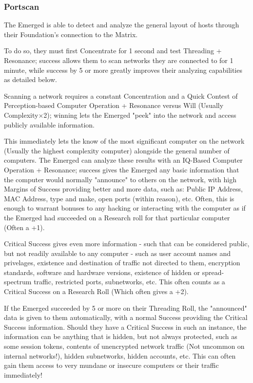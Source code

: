 \begin{multicols*}{3}
	\subsubsection*{Portscan}\label{portscan}
	
	The Emerged is able to detect and analyze the general layout of hosts through their Foundation's connection to the Matrix.
	
	To do so, they must first Concentrate for 1 second and test Threading + Resonance; success allows them to scan networks they are connected to for 1 minute, while success by 5 or more greatly improves their analyzing capabilities as detailed below.
	
	Scanning a network requires a constant Concentration and a Quick Contest of Perception-based Computer Operation + Resonance versus Will (Usually Complexity$\times$2); winning lets the Emerged "peek" into the network and access publicly available information. 
	
	This immediately lets the know of the most significant computer on the network (Usually the highest complexity computer) alongside the general number of computers. The Emerged can analyze these results with an IQ-Based Computer Operation + Resonance; success gives the Emerged any basic information that the computer would normally "announce" to others on the network, with high Margins of Success providing better and more data, such as: Public IP Address, MAC Address, type and make, open ports (within reason), etc. Often, this is enough to warrant bonuses to any hacking or interacting with the computer as if the Emerged had succeeded on a Research roll for that particular computer (Often a +1). 
	
	Critical Success gives even more information - such that can be considered public, but not readily available to any computer - such as user account names and privelages, existence and destination of traffic not directed to them, encryption standards, software and hardware versions, existence of hidden or spread-spectrum traffic, restricted ports, subnetworks, etc. This often counts as a Critical Success on a Research Roll (Which often gives a +2).
	
	If the Emerged succeeded by 5 or more on their Threading Roll, the "announced" data is given to them automatically, with a normal Success providing the Critical Success information. Should they have a Critical Success in such an instance, the information can be anything that is hidden, but not always protected, such as some session tokens, contents of unencrypted network traffic (Not uncommon on internal networks!), hidden subnetworks, hidden accounts, etc. This can often gain them access to very mundane or insecure computers or their traffic immediately!
	

\end{multicols*}
